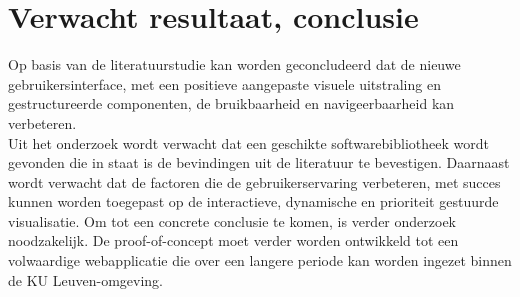 \section{Verwacht resultaat, conclusie}%
\label{sec:verwachte_resultaten}
Op basis van de literatuurstudie kan worden geconcludeerd dat de nieuwe gebruikersinterfa\-ce, met een positieve aangepaste visuele uitstraling en gestructureerde componenten, de bruikbaarheid en navigeerbaarheid kan verbeteren. \\Uit het onderzoek wordt verwacht dat een geschikte softwarebibliotheek wordt gevonden die in staat is de bevindingen uit de literatuur te bevestigen. Daarnaast wordt verwacht dat de factoren die de gebruikerservaring verbeteren, met succes kunnen worden toegepast op de interactieve, dynamische en prioriteit gestuurde visualisatie. Om tot een concrete conclusie te komen, is verder onderzoek noodzakelijk. De proof-of-concept moet verder worden ontwikkeld tot een volwaardige webapplicatie die over een langere periode kan worden ingezet binnen de KU Leuven-omgeving.

